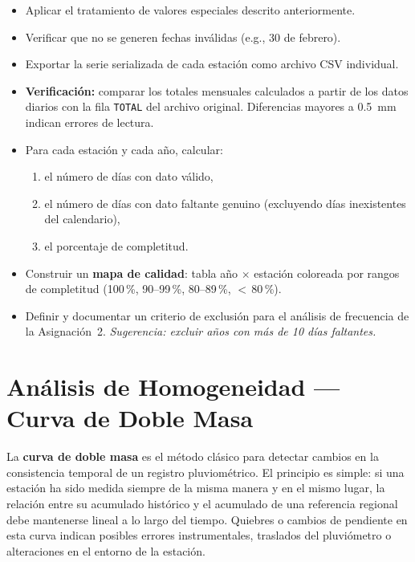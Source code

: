 \documentclass[11pt]{article}
\begin{document}
\begin{itemize}
  \item Aplicar el tratamiento de valores especiales descrito anteriormente.
  \item Verificar que no se generen fechas inválidas (e.g., 30 de febrero).
  \item Exportar la serie serializada de cada estación como archivo CSV individual.
  \item \textbf{Verificación:} comparar los totales mensuales calculados a partir
    de los datos diarios con la fila \texttt{TOTAL} del archivo original.
    Diferencias mayores a 0.5~mm indican errores de lectura.
\end{itemize}


\begin{itemize}
  \item Para cada estación y cada año, calcular:
    \begin{enumerate}[label=\alph*)]
      \item el número de días con dato válido,
      \item el número de días con dato faltante genuino (excluyendo días inexistentes
        del calendario),
      \item el porcentaje de completitud.
    \end{enumerate}
  \item Construir un \textbf{mapa de calidad}: tabla año $\times$ estación coloreada
    por rangos de completitud (100\,\%, 90--99\,\%, 80--89\,\%, $<$\,80\,\%).
  \item Definir y documentar un criterio de exclusión para el análisis de frecuencia
    de la Asignación~2.  \emph{Sugerencia: excluir años con más de 10 días faltantes.}
\end{itemize}

\section{Análisis de Homogeneidad — Curva de Doble Masa}

La \textbf{curva de doble masa} es el método clásico para detectar cambios en la
consistencia temporal de un registro pluviométrico.  El principio es simple: si
una estación ha sido medida siempre de la misma manera y en el mismo lugar, la
relación entre su acumulado histórico y el acumulado de una referencia regional
debe mantenerse lineal a lo largo del tiempo.  Quiebres o cambios de pendiente en
esta curva indican posibles errores instrumentales, traslados del pluviómetro o
alteraciones en el entorno de la estación.
\end{document}
